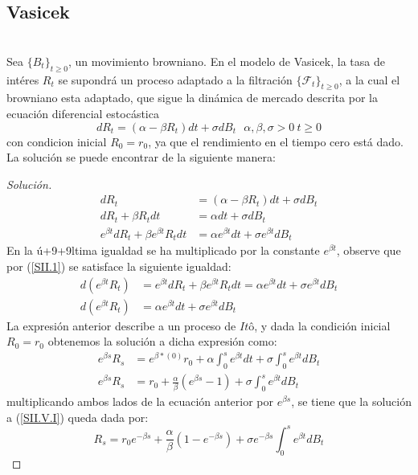 \documentclass[11pt,notitlepage]{article}
\newenvironment{solucion}
  {\begin{proof}[Solución]}
  {\end{proof}}
\begin{document}
        \subsection{Vasicek} \\
        Sea \(\{B_{t}\}_{t\geq0}\), un movimiento browniano. En el modelo de Vasicek, la tasa de intéres \(R_t\) se supondrá un proceso adaptado a la filtración
        \(\{\mathcal{F}_{t}\}_{t\geq0}\), a la cual el browniano esta adaptado, que sigue la dinámica de mercado descrita por la ecuación diferencial estocástica 
        \begin{equation}\label{SII.V.I}
            dR_t = (\alpha - \beta R_t)dt + \sigma dB_t \ \ \ \alpha,\beta,\sigma >0 \ t \geq 0 
        \end{equation}
        con condicion inicial \(R_0 = r_0\), ya que el rendimiento en el tiempo cero está dado. La solución se puede encontrar de la siguiente manera: 
        \begin{solucion}
        \begin{align*}
            dR_t &= (\alpha - \beta R_t)dt + \sigma dB_t\\
            dR_t +\beta R_t dt &= \alpha dt + \sigma dB_t\\ 
            e^{\beta t}dR_t +\beta e^{\beta t}R_t dt &= \alpha e^{\beta t}dt + \sigma e^{\beta t}dB_t
        \end{align*} 
        En la ú+9+9ltima igualdad se ha multiplicado por la constante \(e^{\beta t}\), observe que por (\ref{SII.1}) se satisface 
        la siguiente igualdad: 
        \begin{align*}
            d\left(e^{\beta t}R_t \right)&=e^{\beta t}dR_t +\beta e^{\beta t}R_t dt = \alpha e^{\beta t}dt + \sigma e^{\beta t}dB_t\\
            d\left(e^{\beta t}R_t \right)&=\alpha e^{\beta t}dt + \sigma e^{\beta t}dB_t
        \end{align*}
        La expresión anterior describe a un proceso  de \(Itô\), y dada la condición inicial \(R_0 = r_0\) obtenemos la solución a dicha expresión como: 
        \begin{align*}
            e^{\beta s}R_s  &=  e^{\beta*(0)}r_0 + \alpha\int_{0}^{s}e^{\beta t}dt + \sigma\int_{0}^{s}e^{\beta t}dB_t \\
             e^{\beta s}R_s  &= r_0 + \frac{\alpha}{\beta}\left(e^{\beta s} - 1\right) + \sigma\int_{0}^{s}e^{\beta t}dB_t
        \end{align*}
         multiplicando ambos lados de la ecuación anterior por \(e^{\beta s}\), se tiene que la solución a (\ref{SII.V.I}) queda dada por:
         \begin{equation}\label{SII.V.2}
             R_s  = r_0e^{-\beta s} + \frac{\alpha}{\beta}\left(1 - e^{-\beta s} \right) + \sigma e^{-\beta s}\int_{0}^{s}e^{\beta t}dB_t
         \end{equation}
     \end{solucion}
\end{document}

